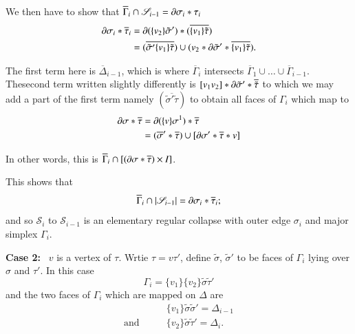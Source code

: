 We then have to show that $\overline{\Gamma}_{i}\cap \mathscr{S}_{i-1}=\partial \sigma_{i}\ast\tau_{i}$
\begin{align*}
\partial \sigma_{i}\ast\overline{\tau}_{i} &= \partial (\{v_{2}\}\tilde{\sigma}')\ast (\overline{\{v_{1}\}\tilde{\tau}})\\
&= (\overline{\tilde{\sigma}'\{v_{1}\}\tilde{\tau}})\cup (v_{2}\ast\partial \tilde{\sigma}'\ast \overline{\{v_{1}\}\tilde{\tau}}).
\end{align*}

The first term here is $\overline{\Delta}_{i-1}$, which is where $\overline{\Gamma}_{i}$ intersects $\overline{\Gamma}_{1}\cup\ldots\cup \overline{\Gamma}_{i-1}$. The\pageoriginale second term written slightly differently is $[v_{1}v_{2}]\ast \partial \tilde{\sigma}'\ast\overline{\tilde{\tau}}$ to which we may add a part of the first term namely $(\overline{\tilde{\sigma}'\tilde{\tau}})$ to obtain all faces of $\Gamma_{i}$ which map to 
\begin{align*}
\partial \sigma\ast\overline{\tau} &= \partial(\{v\}\sigma^{1})\ast\overline{\tau}\\
&=(\overline{\sigma}'\ast\overline{\tau})\cup [\partial \sigma'\ast\overline{\tau}\ast v]
\end{align*}

In other words, this is $\overline{\Gamma}_{i}\cap [(\partial \sigma\ast\overline{\tau})\times I]$.

This shows that
$$
\overline{\Gamma}_{i}\cap |\mathscr{S}_{i-1}|=\partial \sigma_{i}\ast\overline{\tau}_{i};
$$
and so $\mathscr{S}_{i}$ to $\mathscr{S}_{i-1}$ is an elementary regular collapse with outer edge $\sigma_{i}$ and major simplex $\Gamma_{i}$.

\noindent
{\bf Case 2:}~ $v$ is a vertex of $\tau$. Wrtie $\tau=v\tau'$, define $\tilde{\sigma}$, $\tilde{\sigma}'$ to be faces of $\Gamma_{i}$ lying over $\sigma$ and $\tau'$. In this case 
$$
\Gamma_{i}=\{v_{1}\}\{v_{2}\}\tilde{\sigma}\tilde{\tau}'
$$
and the two faces of $\Gamma_{i}$ which are mapped on $\Delta$ are 
\begin{align*}
& \{v_{1}\}\tilde{\sigma}\tilde{\sigma}'=\Delta_{i-1}\\
\text{and}\qquad & \{v_{2}\}\tilde{\sigma}\tilde{\tau}'=\Delta_{i}.
\end{align*}

